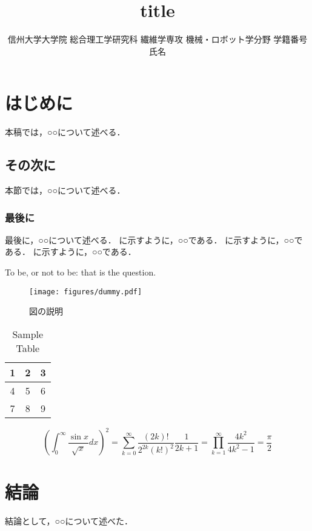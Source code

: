 \documentclass{classes/resume}
\title{
	title
}
\author{
	信州大学大学院 総合理工学研究科 繊維学専攻 機械・ロボット学分野 学籍番号 氏名
}
\begin{document}
\maketitle

\section{はじめに}
本稿では，○○について述べる．
\subsection{その次に}
本節では，○○について述べる．
\subsubsection{最後に}
最後に，○○について述べる．
に示すように，○○である．
に示すように，○○である．
に示すように，○○である．

To be, or not to be: that is the question.


\begin{figure}[htbp]
    \centering
    \texttt{[image: figures/dummy.pdf]}
    \caption{図の説明 \cite{ref:nomura2022uwb} \cite{ref:青空文庫Aozo22:online}}
    \label{fig:fig1}
\end{figure}

\begin{table}[htbp]
    \centering
    \caption{Sample Table}
    \begin{tabular}{|c|c|c|}
        \hline
        1 & 2 & 3 \\
        \hline
        4 & 5 & 6 \\
        \hline
        7 & 8 & 9 \\
        \hline
    \end{tabular}
    \label{tab:sample}
\end{table}

\begin{equation}
    \left( \int_{0}^\infty \frac{\sin x}{\sqrt {x}} dx \right)^{2}
    = \sum_{k = 0}^\infty \frac{(2k)!}{2^{2k}(k!)^{2}} \frac{1}{2k + 1}
    = \prod_{k = 1}^\infty \frac{4k^{2}}{4k^{2} - 1} = \frac{\pi}{2}
    \label{eq:label}
\end{equation}

\section{結論}
結論として，○○について述べた．


\end{document}
